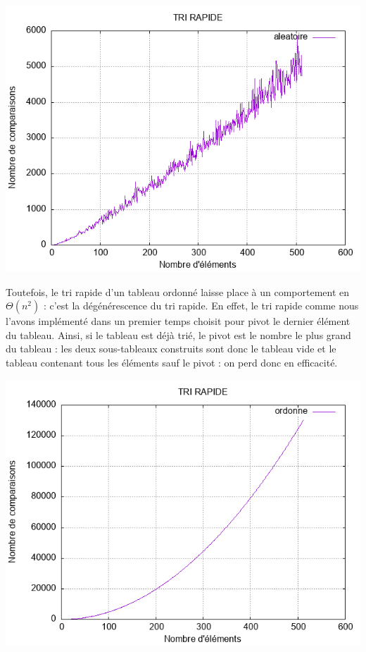\documentclass[11pt]{article}
\begin{document}
\begin{center}
\includegraphics[scale=0.6]{images/tri_rapide_aleat.png}
\end{center}

Toutefois, le tri rapide d'un tableau ordonné laisse place à un comportement en $\Theta(n^2)$ : c'est la dégénérescence du tri rapide. En effet, le tri rapide comme nous l'avons implémenté dans un premier temps choisit pour pivot le dernier élément du tableau. Ainsi, si le tableau est déjà trié, le pivot est le nombre le plus grand du tableau : les deux sous-tableaux construits sont donc le tableau vide et le tableau contenant tous les éléments sauf le pivot : on perd donc en efficacité. 

\begin{center}
\includegraphics[scale=0.6]{images/tri_rapide_degen.png}
\end{center}
\end{document}
